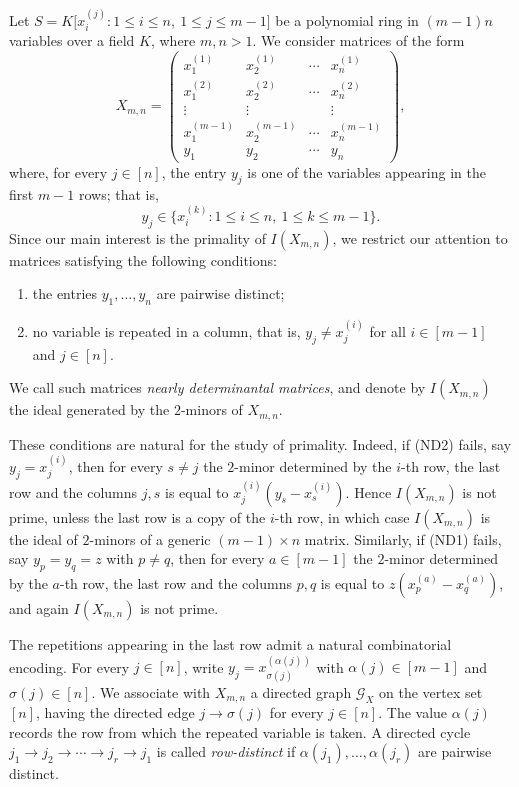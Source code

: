 \documentclass[12pt]{amsart}
\numberwithin{equation}{section}
\begin{document}
Let $S=K\bigl[x_i^{(j)}:1\leq i\leq n,\ 1\leq j\leq m-1\bigr]$ be a polynomial ring in $(m-1)n$ variables over a field $K$, where
$m,n>1$. We consider matrices of the form
\[
X_{m,n}=
\begin{pmatrix}
x_1^{(1)} & x_2^{(1)} & \cdots & x_n^{(1)}\\
x_1^{(2)} & x_2^{(2)} & \cdots & x_n^{(2)}\\
\vdots & \vdots & & \vdots\\
x_1^{(m-1)} & x_2^{(m-1)} & \cdots & x_n^{(m-1)}\\
y_1 & y_2 & \cdots & y_n
\end{pmatrix},
\]
where, for every $j\in[n]$, the entry $y_j$ is one of the variables
appearing in the first $m-1$ rows; that is,
\[
y_j\in
\bigl\{
x_i^{(k)}:1\leq i\leq n,\ 1\leq k\leq m-1
\bigr\}.
\]
Since our main interest is the primality of $I(X_{m,n})$, we restrict
our attention to matrices satisfying the following conditions:
\begin{enumerate}
    \item[(ND1)] the entries $y_1,\ldots,y_n$ are pairwise distinct;
    \item[(ND2)] no variable is repeated in a column, that is, $y_j\neq x_j^{(i)}$ for all $i\in[m-1]$ and $j\in[n].$
\end{enumerate}
We call such matrices \emph{nearly determinantal matrices}, and denote
by $I(X_{m,n})$ the ideal generated by the $2$-minors of $X_{m,n}$.

These conditions are natural for the study of primality. Indeed, if (ND2) fails, say $y_j=x_j^{(i)}$, then for every $s\neq j$ the $2$-minor determined by the $i$-th row, the last row and the columns $j,s$ is equal to $x_j^{(i)}(y_s-x_s^{(i)})$. Hence $I(X_{m,n})$ is not prime, unless the last row is a copy of the $i$-th row, in which case $I(X_{m,n})$ is the ideal of $2$-minors of a generic $(m-1)\times n$ matrix. Similarly, if (ND1) fails, say $y_p=y_q=z$ with $p\neq q$, then for every $a\in[m-1]$ the $2$-minor determined by the $a$-th row, the last row and the columns $p,q$ is equal to $z(x_p^{(a)}-x_q^{(a)})$, and again $I(X_{m,n})$ is not prime.

The repetitions appearing in the last row admit a natural combinatorial encoding. For every $j\in[n]$, write $y_j=x_{\sigma(j)}^{(\alpha(j))}$
with $\alpha(j)\in[m-1]$ and $\sigma(j)\in[n]$. We associate with $X_{m,n}$ a directed graph $\mathcal G_X$ on the vertex set $[n]$,
having the directed edge $j\longrightarrow \sigma(j)$ for every $j\in[n]$. The value $\alpha(j)$ records the row from which
the repeated variable is taken. A directed cycle
$j_1\longrightarrow j_2\longrightarrow\cdots
\longrightarrow j_r\longrightarrow j_1$ is called \emph{row-distinct} if $\alpha(j_1),\ldots,\alpha(j_r)$ are pairwise distinct.
\end{document}
